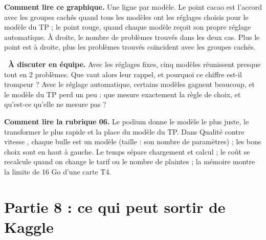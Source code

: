 
\begin{lire}
\textbf{Comment lire ce graphique.} Une ligne par modèle. Le point cacao est l'accord avec les groupes
cachés quand tous les modèles ont les réglages choisis pour le modèle du TP ; le point rouge, quand chaque
modèle reçoit son propre réglage automatique. À droite, le nombre de problèmes trouvés dans les deux cas.
Plus le point est à droite, plus les problèmes trouvés coïncident avec les groupes cachés.
\end{lire}

\begin{questionbox}
\textbf{\faComments\ À discuter en équipe.} Avec les réglages fixes, cinq modèles réunissent presque tout
en 2 problèmes. Que vaut alors leur rappel, et pourquoi ce chiffre est-il trompeur ? Avec le réglage
automatique, certains modèles gagnent beaucoup, et le modèle du TP perd un peu : que mesure exactement la
règle de choix, et qu'est-ce qu'elle ne mesure pas ?
\end{questionbox}


\begin{lire}
\textbf{Comment lire la rubrique 06.} Le podium donne le modèle le plus juste, le transformer le plus
rapide et la place du modèle du TP. Dans \og Qualité contre vitesse \fg, chaque bulle est un modèle
(taille : son nombre de paramètres) ; les bons choix sont en haut à gauche. Le temps sépare chargement et
calcul ; le coût se recalcule quand on change le tarif ou le nombre de plaintes ; la mémoire montre la
limite de 16 Go d'une carte T4.
\end{lire}

\section{Partie 8 : ce qui peut sortir de Kaggle}

\begin{center}
\end{center}

